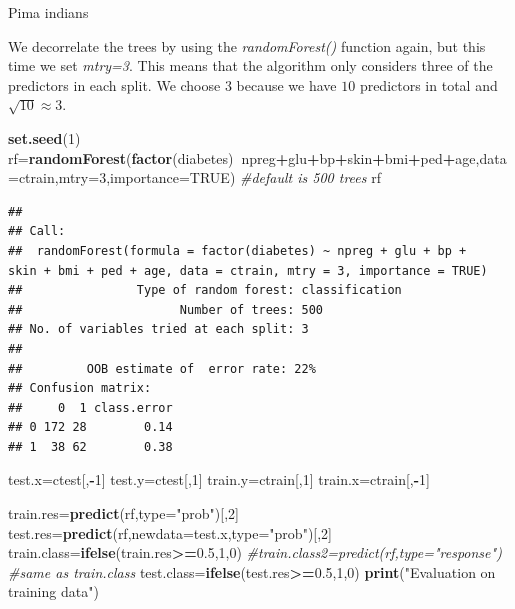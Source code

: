 \documentclass[
  ignorenonframetext,
]{beamer}
\newenvironment{Shaded}{\begin{snugshade}}{\end{snugshade}}
\newcommand{\CommentTok}[1]{\textcolor[rgb]{0.56,0.35,0.01}{\textit{#1}}}
\newcommand{\DataTypeTok}[1]{\textcolor[rgb]{0.13,0.29,0.53}{#1}}
\newcommand{\DecValTok}[1]{\textcolor[rgb]{0.00,0.00,0.81}{#1}}
\newcommand{\FloatTok}[1]{\textcolor[rgb]{0.00,0.00,0.81}{#1}}
\newcommand{\KeywordTok}[1]{\textcolor[rgb]{0.13,0.29,0.53}{\textbf{#1}}}
\newcommand{\NormalTok}[1]{#1}
\newcommand{\OperatorTok}[1]{\textcolor[rgb]{0.81,0.36,0.00}{\textbf{#1}}}
\newcommand{\OtherTok}[1]{\textcolor[rgb]{0.56,0.35,0.01}{#1}}
\newcommand{\StringTok}[1]{\textcolor[rgb]{0.31,0.60,0.02}{#1}}
\begin{document}
\begin{frame}[fragile]

\begin{block}{Pima indians}

We decorrelate the trees by using the \emph{randomForest()} function
again, but this time we set \emph{mtry=3}. This means that the algorithm
only considers three of the predictors in each split. We choose \(3\)
because we have \(10\) predictors in total and \(\sqrt{10}\approx 3\).

\begin{Shaded}
\begin{Highlighting}[]
\KeywordTok{set.seed}\NormalTok{(}\DecValTok{1}\NormalTok{)}
\NormalTok{rf=}\KeywordTok{randomForest}\NormalTok{(}\KeywordTok{factor}\NormalTok{(diabetes)}\OperatorTok{~}\NormalTok{npreg}\OperatorTok{+}\NormalTok{glu}\OperatorTok{+}\NormalTok{bp}\OperatorTok{+}\NormalTok{skin}\OperatorTok{+}\NormalTok{bmi}\OperatorTok{+}\NormalTok{ped}\OperatorTok{+}\NormalTok{age,}\DataTypeTok{data=}\NormalTok{ctrain,}\DataTypeTok{mtry=}\DecValTok{3}\NormalTok{,}\DataTypeTok{importance=}\OtherTok{TRUE}\NormalTok{) }\CommentTok{#default is 500 trees}
\NormalTok{rf}
\end{Highlighting}
\end{Shaded}

\begin{verbatim}
## 
## Call:
##  randomForest(formula = factor(diabetes) ~ npreg + glu + bp +      skin + bmi + ped + age, data = ctrain, mtry = 3, importance = TRUE) 
##                Type of random forest: classification
##                      Number of trees: 500
## No. of variables tried at each split: 3
## 
##         OOB estimate of  error rate: 22%
## Confusion matrix:
##     0  1 class.error
## 0 172 28        0.14
## 1  38 62        0.38
\end{verbatim}

\begin{Shaded}
\begin{Highlighting}[]
\NormalTok{test.x=ctest[,}\OperatorTok{-}\DecValTok{1}\NormalTok{]}
\NormalTok{test.y=ctest[,}\DecValTok{1}\NormalTok{]}
\NormalTok{train.y=ctrain[,}\DecValTok{1}\NormalTok{]}
\NormalTok{train.x=ctrain[,}\OperatorTok{-}\DecValTok{1}\NormalTok{]}

\NormalTok{train.res=}\KeywordTok{predict}\NormalTok{(rf,}\DataTypeTok{type=}\StringTok{"prob"}\NormalTok{)[,}\DecValTok{2}\NormalTok{]}
\NormalTok{test.res=}\KeywordTok{predict}\NormalTok{(rf,}\DataTypeTok{newdata=}\NormalTok{test.x,}\DataTypeTok{type=}\StringTok{"prob"}\NormalTok{)[,}\DecValTok{2}\NormalTok{]}
\NormalTok{train.class=}\KeywordTok{ifelse}\NormalTok{(train.res}\OperatorTok{>=}\FloatTok{0.5}\NormalTok{,}\DecValTok{1}\NormalTok{,}\DecValTok{0}\NormalTok{)}
\CommentTok{#train.class2=predict(rf,type="response") #same as train.class}
\NormalTok{test.class=}\KeywordTok{ifelse}\NormalTok{(test.res}\OperatorTok{>=}\FloatTok{0.5}\NormalTok{,}\DecValTok{1}\NormalTok{,}\DecValTok{0}\NormalTok{)}
\KeywordTok{print}\NormalTok{(}\StringTok{"Evaluation on training data"}\NormalTok{)}
\end{Highlighting}
\end{Shaded}


\end{block}
\end{frame}
\end{document}
